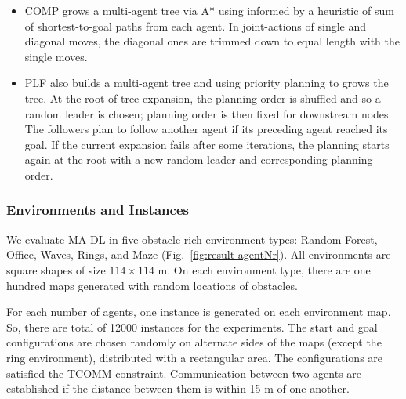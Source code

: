 \documentclass[letterpaper, 10 pt, conference]{ieeeconf}  %
\begin{document}
\begin{itemize}
    \item COMP grows a multi-agent tree via A* using informed by a heuristic of sum of shortest-to-goal paths from each agent.
    In joint-actions of single and diagonal moves, the diagonal ones are trimmed down to equal length with the single moves.
    \item PLF also builds a multi-agent tree and using priority 
    planning to grows the tree. At the root of tree expansion, the planning order is shuffled and so a 
    random leader is chosen; planning order is then fixed for downstream nodes.
    The followers plan to follow another agent if its preceding agent reached its goal.
    If the current expansion fails after some iterations, the planning starts again at the root with a 
    new random leader and corresponding planning order.
\end{itemize}


\subsubsection{Environments and Instances} 
We evaluate MA-DL in five obstacle-rich environment types: Random Forest, Office, Waves, Rings, and Maze 
(Fig.~\ref{fig:result-agentNr}). All environments are square shapes of size $114 \times 114 $ m. 
On each environment type, there are one hundred maps generated with random locations of obstacles.

For each number of agents, one instance is generated on each environment map. 
So, there are total of 12000 instances for the experiments. 
The start and goal configurations are chosen randomly on alternate sides of the maps (except the ring environment), distributed with a rectangular area. 
The configurations are satisfied the TCOMM constraint.
Communication between two agents are established if the distance between them is within 15 m of one another.
\end{document}
